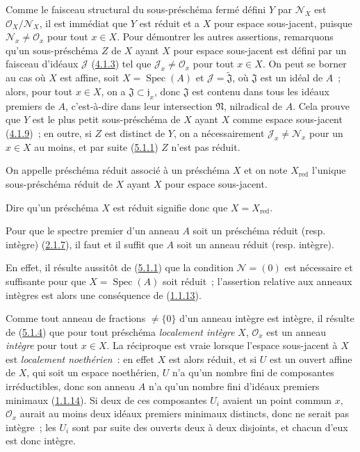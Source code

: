 Comme le faisceau structural du sous-préschéma fermé défini $Y$ par
$\mathscr{N}_X$ est $\mathscr{O}_X/\mathscr{N}_X$, il est immédiat que $Y$
est réduit et a $X$ pour espace sous-jacent, puisque
$\mathscr{N}_x\ne\mathscr{O}_x$ pour tout $x\in X$. Pour démontrer les autres
assertions, remarquons qu'un sous-préschéma $Z$ de $X$ ayant $X$ pour espace
sous-jacent est défini par un faisceau d'idéaux $\mathscr{J}$
(\hyperref[I.4.1.3-fr]{4.1.3}) tel que
$\mathscr{J}_x\ne\mathscr{O}_x$ pour tout $x\in X$. On peut se borner au cas
où $X$ est affine, soit $X=\operatorname{Spec}(A)$ et
$\mathscr{J}=\widetilde{\mathfrak{J}}$, où $\mathfrak{J}$ est un idéal de
$A$~; alors, pour tout $x\in X$, on a
$\mathfrak{J}\subset\mathfrak{j}_x$, donc $\mathfrak{J}$ est contenu dans
tous les idéaux premiers de $A$, c'est-à-dire dans leur intersection
$\mathfrak{N}$, nilradical de $A$. Cela prouve que $Y$ est le plus petit
sous-préschéma de $X$ ayant $X$ comme espace sous-jacent
(\hyperref[I.4.1.9-fr]{4.1.9})~; en outre, si $Z$ est distinct de $Y$, on a
nécessairement $\mathscr{J}_x\ne\mathscr{N}_x$ pour un $x\in X$ au moins, et
par suite (\hyperref[I.5.1.1-fr]{5.1.1}) $Z$ n'est pas réduit.

\begin{definition}[5.1.3]
\label{I.5.1.3-fr}
On appelle préschéma réduit associé à un préschéma $X$ et on note
$X_{\mathrm{red}}$ l'unique sous-préschéma réduit de $X$ ayant $X$ pour
espace sous-jacent.
\end{definition}

Dire qu'un préschéma $X$ est réduit signifie donc que
$X=X_{\mathrm{red}}$.

\begin{proposition}[5.1.4]
\label{I.5.1.4-fr}
Pour que le spectre premier d'un anneau $A$ soit un préschéma réduit (resp.
intègre) (\hyperref[I.2.1.7-fr]{2.1.7}), il faut et il suffit que $A$ soit un
anneau réduit (resp. intègre).
\end{proposition}

En effet, il résulte aussitôt de (\hyperref[I.5.1.1-fr]{5.1.1}) que la
condition $\mathscr{N}=(0)$ est nécessaire et suffisante pour que
$X=\operatorname{Spec}(A)$ soit réduit~; l'assertion relative aux anneaux
intègres est alors une conséquence de
(\hyperref[I.1.1.13-fr]{1.1.13}).

Comme tout anneau de fractions $\ne\{0\}$ d'un anneau intègre est intègre, il
résulte de (\hyperref[I.5.1.4-fr]{5.1.4}) que pour tout préschéma
\emph{localement intègre} $X$, $\mathscr{O}_x$ est un anneau \emph{intègre}
pour tout $x\in X$. La réciproque est vraie lorsque l'espace sous-jacent à
$X$ est \emph{localement noethérien}~: en effet $X$ est alors réduit, et si
$U$ est un ouvert affine de $X$, qui soit un espace noethérien, $U$ n'a qu'un
nombre fini de composantes irréductibles, donc son anneau $A$ n'a qu'un
nombre fini d'idéaux premiers minimaux
(\hyperref[I.1.1.14-fr]{1.1.14}). Si deux de ces composantes $U_i$ avaient un
point commun $x$, $\mathscr{O}_x$ aurait au moins deux idéaux premiers
minimaux distincts, donc ne serait pas intègre~; les $U_i$ sont par suite des
ouverts deux à deux disjoints, et chacun d'eux est donc intègre.

